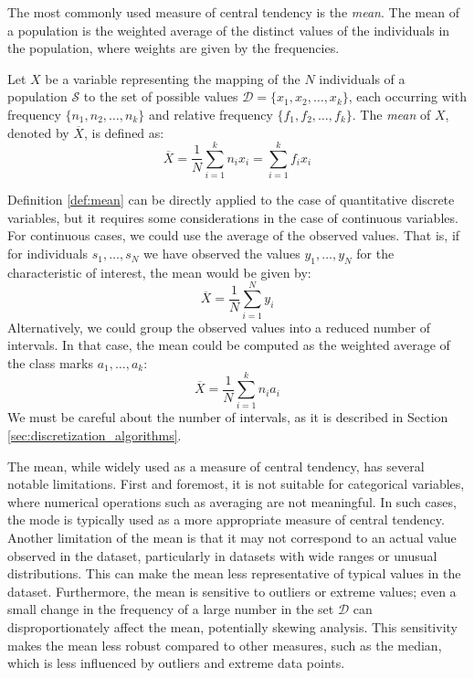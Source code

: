 The most commonly used measure of central tendency is the \emph{mean}. The mean of a population is the weighted average of the distinct values of the individuals in the population, where weights are given by the frequencies.

\begin{definition}
\label{def:mean}
Let $X$ be a variable representing the mapping of the $N$ individuals of a population $\mathcal{S}$ to the set of possible values $\mathcal{D} = \{x_1, x_2, \dots, x_k\}$, each occurring with frequency $\{n_1, n_2, \dots, n_k\}$ and relative frequency $\{f_1, f_2, \dots, f_k\}$. The \emph{mean} of $X$, denoted by $\overline{X}$, is defined as:
\[
\overline{X} = \frac{1}{N} \sum_{i=1}^k n_i x_i = \sum_{i=1}^k f_i x_i
\]
\end{definition}

Definition \ref{def:mean} can be directly applied to the case of quantitative discrete variables, but it requires some considerations in the case of continuous variables. For continuous cases, we could use the average of the observed values. That is, if for individuals $s_1, \ldots, s_N$ we have observed the values $y_1, \ldots, y_N$ for the characteristic of interest, the mean would be given by:
\[
\overline{X} = \frac{1}{N} \sum_{i=1}^N y_i 
\]
Alternatively, we could group the observed values into a reduced number of intervals. In that case, the mean could be computed as the weighted average of the class marks $a_1, \ldots, a_k$:
\[
\overline{X} = \frac{1}{N} \sum_{i=1}^k n_i a_i
\]
We must be careful about the number of intervals, as it is described in Section \ref{sec:discretization_algorithms}.

The mean, while widely used as a measure of central tendency, has several notable limitations. First and foremost, it is not suitable for categorical variables, where numerical operations such as averaging are not meaningful. In such cases, the mode is typically used as a more appropriate measure of central tendency. Another limitation of the mean is that it may not correspond to an actual value observed in the dataset, particularly in datasets with wide ranges or unusual distributions. This can make the mean less representative of typical values in the dataset. Furthermore, the mean is sensitive to outliers or extreme values; even a small change in the frequency of a large number in the set $\mathcal{D}$ can disproportionately affect the mean, potentially skewing analysis. This sensitivity makes the mean less robust compared to other measures, such as the median, which is less influenced by outliers and extreme data points.

